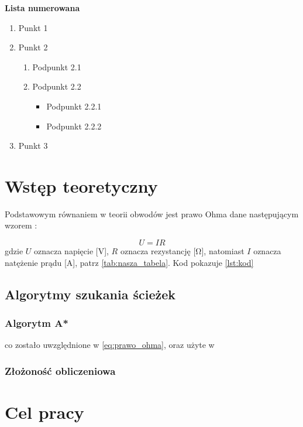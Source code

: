 \noindent \textbf{Lista numerowana}

\begin{enumerate}
    \item Punkt 1
    \item Punkt 2
    \begin{enumerate}
        \item Podpunkt 2.1
        \item Podpunkt 2.2
        \begin{itemize}
            \item Podpunkt 2.2.1
            \item Podpunkt 2.2.2
        \end{itemize}
    \end{enumerate}
    \item Punkt 3
\end{enumerate}

\section{Wstęp teoretyczny}

Podstawowym równaniem w teorii obwodów jest prawo Ohma dane następującym wzorem \cite{Now02}:

\begin{equation}
\label{eq:prawo_ohma}
U = I R    
\end{equation}
gdzie $U$ oznacza napięcie [\si{\volt}], $R$ oznacza rezystancję [\si{\ohm}], natomiast $I$ oznacza natężenie prądu [\si{\ampere}], patrz \cref{tab:nasza_tabela}. Kod pokazuje \cref{lst:kod}

\color{blue}
\subsection{Algorytmy szukania ścieżek}

\subsubsection{Algorytm A*}

co zostało uwzględnione w \cref{eq:prawo_ohma}, oraz użyte w \cite{Nat12,Bar04}

\subsubsection{Złożoność obliczeniowa} 


\section{Cel pracy}

